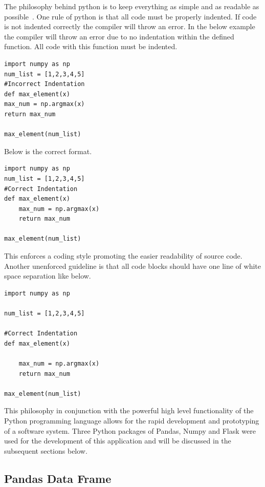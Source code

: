 The philosophy behind python is to keep everything as simple and as readable as possible~\cite{PEP20The74:online}.
One rule of python is that all code must be properly indented. If code is not indented correctly the compiler will throw an error.
In the below example the compiler will throw an error due to no indentation within the defined function. All code with this function must be indented.
\begin{verbatim}
import numpy as np
num_list = [1,2,3,4,5]
#Incorrect Indentation
def max_element(x)
max_num = np.argmax(x)
return max_num

max_element(num_list)
\end{verbatim}
Below is the correct format.
\begin{verbatim}
import numpy as np
num_list = [1,2,3,4,5]
#Correct Indentation
def max_element(x)
	max_num = np.argmax(x)
	return max_num

max_element(num_list)
\end{verbatim}

This enforces  a coding style promoting the easier readability of source code.
Another unenforced guideline is that all code blocks should have one line of white space separation like below.
\begin{verbatim}
import numpy as np

num_list = [1,2,3,4,5]

#Correct Indentation
def max_element(x)

	max_num = np.argmax(x)
	return max_num

max_element(num_list)
\end{verbatim}

This philosophy in conjunction with the powerful high level functionality of the Python programming language allows for the rapid development and prototyping of a software system. Three Python packages of Pandas, Numpy and Flask were used for the development of this application and will be discussed in the subsequent sections below.

\subsection{Pandas Data Frame}


